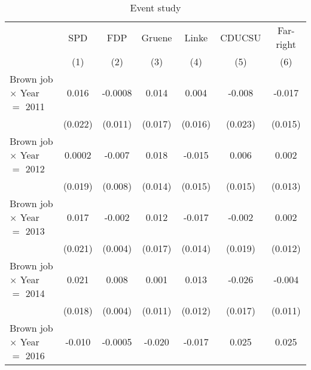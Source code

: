 \begin{table}[htbp]
   \caption{Event study}
   \centering
   \begin{tabular}{lcccccc}
      \tabularnewline \midrule \midrule
                                        & SPD                    & FDP                     & Gruene                  & Linke                   & CDUCSU                  & Far-right\\  
                                        & (1)                    & (2)                     & (3)                     & (4)                     & (5)                     & (6)\\  
      Brown job $\times$ Year $=$ 2011  & 0.016                  & -0.0008                 & 0.014                   & 0.004                   & -0.008                  & -0.017\\   
                                        & (0.022)                & (0.011)                 & (0.017)                 & (0.016)                 & (0.023)                 & (0.015)\\   
      Brown job $\times$ Year $=$ 2012  & 0.0002                 & -0.007                  & 0.018                   & -0.015                  & 0.006                   & 0.002\\   
                                        & (0.019)                & (0.008)                 & (0.014)                 & (0.015)                 & (0.015)                 & (0.013)\\   
      Brown job $\times$ Year $=$ 2013  & 0.017                  & -0.002                  & 0.012                   & -0.017                  & -0.002                  & 0.002\\   
                                        & (0.021)                & (0.004)                 & (0.017)                 & (0.014)                 & (0.019)                 & (0.012)\\   
      Brown job $\times$ Year $=$ 2014  & 0.021                  & 0.008                   & 0.001                   & 0.013                   & -0.026                  & -0.004\\   
                                        & (0.018)                & (0.004)                 & (0.011)                 & (0.012)                 & (0.017)                 & (0.011)\\   
      Brown job $\times$ Year $=$ 2016  & -0.010                 & -0.0005                 & -0.020                  & -0.017                  & 0.025                   & 0.025\\   

\end{tabular}
\end{table}
